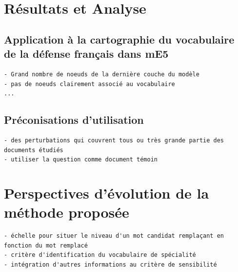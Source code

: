 
\section{Résultats et Analyse}

    \subsection{Application à la cartographie du vocabulaire de la défense français dans mE5}
        \begin{verbatim}
- Grand nombre de noeuds de la dernière couche du modèle
- pas de noeuds clairement associé au vocabulaire
...
        \end{verbatim}


    \subsection{Préconisations d'utilisation}
        \begin{verbatim}
- des perturbations qui couvrent tous ou très grande partie des documents étudiés
- utiliser la question comme document témoin
        \end{verbatim}


\section{Perspectives d'évolution de la méthode proposée}

    \begin{verbatim}
- échelle pour situer le niveau d'un mot candidat remplaçant en fonction du mot remplacé
- critère d'identification du vocabulaire de spécialité
- intégration d'autres informations au critère de sensibilité
    \end{verbatim}